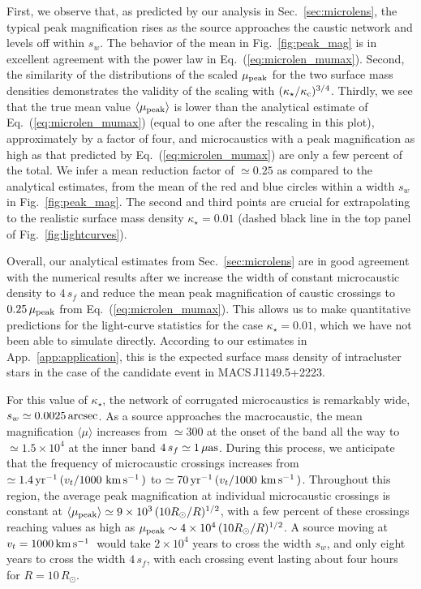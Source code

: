 \documentclass{aastex6}
\newcommand{\refeq}[1]{Eq.~(\ref{eq:#1})}
\newcommand{\reffig}[1]{Fig.~\ref{fig:#1}}
\newcommand{\refsec}[1]{Sec.~\ref{sec:#1}}
\newcommand{\refapp}[1]{App.~\ref{app:#1}}
\def\kms{\, {\rm km}\, {\rm s}^{-1}\, }
\begin{document}
 First, we observe that, as predicted by our analysis in \refsec{microlens}, the typical peak magnification rises as the source approaches the caustic network and levels off within $s_w$. The behavior of the mean in \reffig{peak_mag} is in excellent agreement with the power law in \refeq{microlen_mumax}. Second, the similarity of the distributions of the scaled $\mu_{\rm peak}$ for the two surface mass densities demonstrates the validity of the scaling with $(\kappa_\star/\kappa_{\rm c})^{3/4}$. Thirdly, we see that the true mean value $\langle \mu_{\rm peak} \rangle$ is lower than the analytical estimate of \refeq{microlen_mumax} (equal to one after the rescaling in this plot), approximately by a factor of four, and microcaustics with a peak magnification as high as that predicted by \refeq{microlen_mumax} are only a few percent of the total. We infer a mean reduction factor of $\simeq 0.25$ as compared to the analytical estimates, from the mean of the red and blue circles within a width $s_w$ in \reffig{peak_mag}. The second and third points are crucial for extrapolating to the realistic surface mass density $\kappa_\star = 0.01$ (dashed black line in the top panel of \reffig{lightcurves}).

Overall, our analytical estimates from \refsec{microlens} are in good agreement with the numerical results after we increase the width of constant microcaustic density to $4\,s_f$ and reduce the mean peak magnification of caustic crossings to $0.25\, \mu_{\rm peak}$ from \refeq{microlen_mumax}. This allows us to make quantitative predictions for the light-curve statistics for the case $\kappa_\star = 0.01$, which we have not been able to simulate directly. According to our estimates in \refapp{application}, this is the expected surface mass density of intracluster stars in the case of the candidate event in MACS\,J1149.5+2223.

For this value of $\kappa_\star$, the network of corrugated microcaustics is remarkably wide, $s_w \simeq 0.0025\,{\rm arcsec}$. As a source approaches the macrocaustic, the mean magnification $\langle \mu \rangle$ increases from $\simeq 300$ at the onset of the band all the way to $\simeq 1.5\times 10^4$ at the inner band $4\,s_f \simeq 1\,\mu{\rm as}$. During this process, we anticipate that the frequency of microcaustic crossings increases from $\simeq 1.4\,{\rm yr}^{-1}\,(v_t/1000\,\kms)$ to $\simeq 70\,{\rm yr}^{-1}\,(v_t/1000\,\kms)$. Throughout this region, the average peak magnification at individual microcaustic crossings is constant at $\langle \mu_{\rm peak} \rangle \simeq 9\times 10^3\,(10 R_\odot/R)^{1/2}$, with a few percent of these crossings reaching values as high as $\mu_{\rm peak}\sim 4\times 10^4\, (10 R_{\odot}/R)^{1/2}$. A source moving at $v_t=1000 \kms$ would take $2\times 10^4$ years to cross the width $s_w$, and only eight years to cross the width $4 \, s_f$, with each crossing event lasting about four hours for $R=10 \, R_\odot$.
\end{document}
